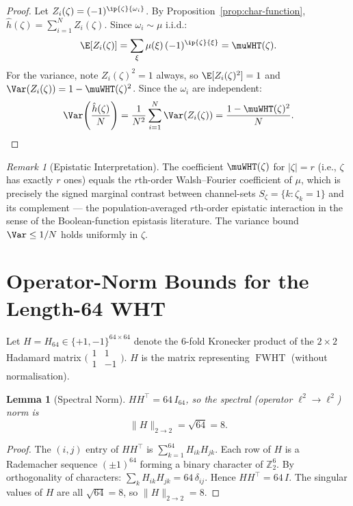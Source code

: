\documentclass[12pt,letterpaper]{article}
\theoremstyle{definition}
\theoremstyle{plain}
\newtheorem{lemma}[theorem]{Lemma}
\theoremstyle{remark}
\newtheorem*{remark}{Remark}
\newcommand{\FWHT}{\operatorname{FWHT}}
\newcommand{\hhat}{\hat{h}}
\begin{document}
\begin{proof}
Let $Z_i(\zeta) = (-1)^{\ip{\zeta}{\omega_i}}$.  By
Proposition~\ref{prop:char-function}, $\hhat(\zeta) = \sum_{i=1}^N Z_i(\zeta)$.
Since $\omega_i \sim \mu$ i.i.d.:
\[
  \E[Z_i(\zeta)]
    = \sum_\xi \mu(\xi)\,(-1)^{\ip{\zeta}{\xi}}
    = \muWHT(\zeta).
\]
For the variance, note $Z_i(\zeta)^2 = 1$ always, so
$\E[Z_i(\zeta)^2] = 1$ and
$\Var(Z_i(\zeta)) = 1 - \muWHT(\zeta)^2$.
Since the $\omega_i$ are independent:
\[
  \Var\!\left(\frac{\hhat(\zeta)}{N}\right)
    = \frac{1}{N^2}\sum_{i=1}^N \Var(Z_i(\zeta))
    = \frac{1 - \muWHT(\zeta)^2}{N}.
    \qedhere
\]
\end{proof}

\begin{remark}[Epistatic Interpretation]
The coefficient $\muWHT(\zeta)$ for $|\zeta|=r$ (i.e., $\zeta$ has exactly
$r$ ones) equals the $r$th-order Walsh--Fourier coefficient of $\mu$,
which is precisely the signed marginal contrast between channel-sets
$S_\zeta = \{k : \zeta_k=1\}$ and its complement --- the population-averaged
$r$th-order epistatic interaction in the sense of the Boolean-function
epistasis literature.
The variance bound $\Var \le 1/N$ holds uniformly in $\zeta$.
\end{remark}

\section{Operator-Norm Bounds for the Length-64 WHT}

Let $H = H_{64} \in \{+1,-1\}^{64\times64}$ denote the $6$-fold
Kronecker product of the $2\times 2$ Hadamard matrix
$\bigl(\begin{smallmatrix}1&1\\1&-1\end{smallmatrix}\bigr)$.
$H$ is the matrix representing $\FWHT$ (without normalisation).

\begin{lemma}[Spectral Norm]
\label{lem:l2-norm}
$H H^\top = 64\,I_{64}$, so the spectral (operator $\ell^2\to\ell^2$) norm is
\[
  \|H\|_{2\to 2} = \sqrt{64} = 8.
\]
\end{lemma}

\begin{proof}
The $(i,j)$ entry of $HH^\top$ is
$\sum_{k=1}^{64}H_{ik}H_{jk}$.
Each row of $H$ is a Rademacher sequence $(\pm 1)^{64}$ forming a
binary character of $\mathbb{Z}_2^6$.  By orthogonality of characters:
$\sum_{k} H_{ik}H_{jk} = 64\,\delta_{ij}$.
Hence $HH^\top = 64\,I$.  The singular values of $H$ are all $\sqrt{64}=8$,
so $\|H\|_{2\to 2}=8$.
\end{proof}
\end{document}
